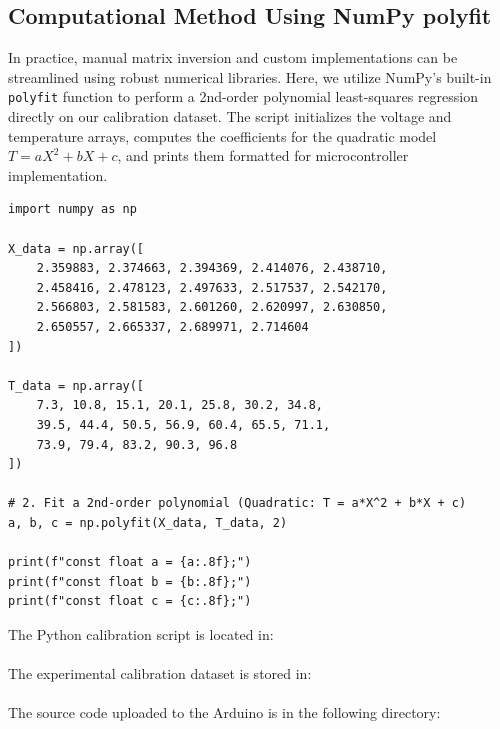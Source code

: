 \documentclass[12pt,a4paper]{article}
\begin{document}
\subsection{Computational Method Using NumPy polyfit}
In practice, manual matrix inversion and custom implementations can be streamlined using robust numerical libraries. Here, we utilize NumPy's built-in \texttt{polyfit} function to perform a 2nd-order polynomial least-squares regression directly on our calibration dataset. The script initializes the voltage and temperature arrays, computes the coefficients for the quadratic model \(T = aX^2 + bX + c\), and prints them formatted for microcontroller implementation.

\begin{tcolorbox}[colback=gray!5!white,colframe=gray!75!black,title=Python: Polynomial Curve Fitting via NumPy polyfit]
\small
\begin{verbatim}
import numpy as np

X_data = np.array([
    2.359883, 2.374663, 2.394369, 2.414076, 2.438710,
    2.458416, 2.478123, 2.497633, 2.517537, 2.542170,
    2.566803, 2.581583, 2.601260, 2.620997, 2.630850,
    2.650557, 2.665337, 2.689971, 2.714604
])

T_data = np.array([
    7.3, 10.8, 15.1, 20.1, 25.8, 30.2, 34.8,
    39.5, 44.4, 50.5, 56.9, 60.4, 65.5, 71.1,
    73.9, 79.4, 83.2, 90.3, 96.8
])

# 2. Fit a 2nd-order polynomial (Quadratic: T = a*X^2 + b*X + c)
a, b, c = np.polyfit(X_data, T_data, 2)

print(f"const float a = {a:.8f};")
print(f"const float b = {b:.8f};")
print(f"const float c = {c:.8f};")
\end{verbatim}
\end{tcolorbox}

\begin{center}
    \small
    The Python calibration script is located in:\\[0.3em]
    \\[1em]
    
    The experimental calibration dataset is stored in:\\[0.3em]
    \\[1em]
    
    The source code uploaded to the Arduino is in the following directory:\\[0.3em]
\end{center}
\end{document}
